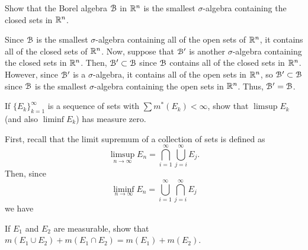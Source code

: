 \begin{problem}
  Show that the Borel algebra $\mathcal{B}$ in $\mathbb{R}^n$ is the smallest
  $\sigma$-algebra containing the closed sets in $\mathbb{R}^n$.
\end{problem}
\begin{solution}
  Since $\mathcal{B}$ is the smallest $\sigma$-algebra containing all of the open
  sets of $\mathbb{R}^n$, it contains all of the closed sets of $\mathbb{R}^n$. Now,
  suppose that $\mathcal{B}'$ is another $\sigma$-algebra containing the closed
  sets in $\mathbb{R}^n$. Then, $\mathcal{B}'\subset\mathcal{B}$ since $\mathcal{B}$ contains all
  of the closed sets in $\mathbb{R}^n$. However, since $\mathcal{B}'$ is a
  $\sigma$-algebra, it contains all of the open sets in $\mathbb{R}^n$, so
  $\mathcal{B}'\subset\mathcal{B}$ since $\mathcal{B}$ is the smallest $\sigma$-algebra
  containing the open sets in $\mathbb{R}^n$. Thus, $\mathcal{B}'=\mathcal{B}$.
\end{solution}

\begin{problem}
  If ${\{E_k\}}_{k=1}^\infty$ is a sequence of sets with
  $\sum m^*(E_k)<\infty$, show that $\limsup E_k$ (and also $\liminf E_k$)
  has measure zero.
\end{problem}
\begin{solution}
  First, recall that the limit supremum of a collection of sets is defined
  as
  \[
    \limsup_{n\to\infty} E_n=\bigcap_{i=1}^\infty\bigcup_{j=i}^\infty E_j.
  \]
  Then, since
  \[
    \liminf_{n\to\infty} E_n=\bigcup_{i=1}^\infty\bigcap_{j=i}^\infty E_j
  \]
  we have
\end{solution}

\begin{problem}
  If $E_1$ and $E_2$ are measurable, show that
  $m(E_1\cup E_2)+m(E_1\cap E_2)=m(E_1)+m(E_2)$.
\end{problem}
\begin{solution}
\end{solution}

